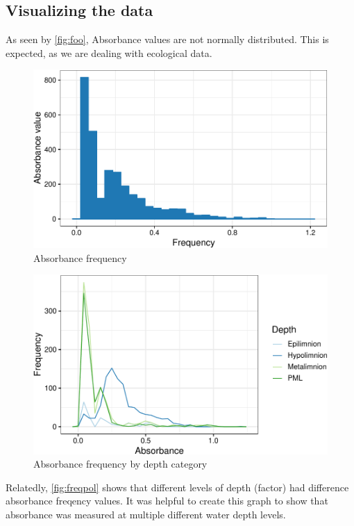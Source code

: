 \documentclass[12pt,]{article}
\begin{document}
\subsection{Visualizing the data}\label{visualizing-the-data}

As seen by \autoref{fig:foo}, Absorbance values are not normally
distributed. This is expected, as we are dealing with ecological data.

\begin{figure}
\centering
\includegraphics{Bash_ENV872_Project_files/figure-latex/foo-1.pdf}
\caption{\label{fig:foo}Absorbance frequency}
\end{figure}

\begin{figure}
\centering
\includegraphics{Bash_ENV872_Project_files/figure-latex/freqpol-1.pdf}
\caption{\label{fig:freqpol}Absorbance frequency by depth category}
\end{figure}

Relatedly, \autoref{fig:freqpol} shows that different levels of depth
(factor) had difference absorbance freqency values. It was helpful to
create this graph to show that absorbance was measured at multiple
different water depth levels.
\end{document}
